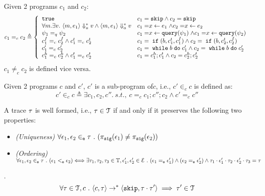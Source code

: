 \begin{defn}
%
\label{def:aq_prog}
Given 2 programs $c_1$ and $c_2$:
\[
c_1 =_{c} c_2
\triangleq 
\left\{
  \begin{array}{ll} 
    \etrue        
    & c_1 = \eskip \land c_2 = \eskip
    \\ 
    \forall m. \exists v. ~ \config{m, \expr_1} \aarrow^{*} v \land \config{m, \expr_1} \aarrow^{*} v     
    & c_1 = \assign{x}{\expr_1} \land c_2 = \assign{x}{\expr_2} 
    \\ 
    \qexpr_1 =_{q} \qexpr_2       
    & c_1 = \assign{x}{\query(\qexpr_1)} \land c_1 = \assign{x}{\query(\qexpr_2)} 
    \\
    c_1^f =_{c} c_2^f \land c_1^t =_{c} c_2^t
    & c_1 = \eif(b, c_1^t, c_1^f) \land c_2 = \eif(b, c_2^t, c_2^f)
    \\ 
    c_1' =_{c} c_2'         
    & c_1 = \ewhile b \edo c_1' \land c_2 = \ewhile b \edo c_2'
    \\ 
    c_1^h =_{c} c_2^h \land c_1^t =_{c} c_2^t
    & c_1 = c_1^h;c_1^t \land c_2 = c_2^h;c_2^t 
  \end{array}
  \right.
\]
%
$c_1 \neq_{c} c_2$  is defined vice versa.
%
\end{defn}
%
Given 2 programs $c$ and $c'$, $c'$ is a sub-program of$c$, i.e., $c' \in_{c} c$ is defined as:
\begin{equation}
c' \in_{c} c \triangleq \exists c_1, c_2, c''. ~ s.t.,~
c =_{c} c_1; c''; c_2 \land c' =_{c} c''
\end{equation} 
%
\begin{defn}
\label{def:wf_trace}
A trace $\mathtt{\tau}$ is well formed, i.e., $\mathtt{\tau} \in \mathcal{T}$ if and only if it preserves the following two properties:
\begin{itemize}
\item{\emph{(Uniqueness)}} 
$\forall \mathtt{\epsilon}_1, \mathtt{\epsilon}_2 \in_{\mathtt{e}} \mathtt{\tau} 
~.~ (\pi_{\mathtt{sig}}(\mathtt{\epsilon}_1) \neq \pi_{\mathtt{sig}}(\mathtt{\epsilon}_2) )$
%
\item{\emph{(Ordering)}} $\forall \mathtt{\epsilon}_1, \mathtt{\epsilon}_2 \in_{\mathtt{e}} \mathtt{\tau} ~.~ 
(\mathtt{\epsilon}_1 <_{\mathtt{e}} \mathtt{\epsilon}_2) \Longleftrightarrow
\exists \mathtt{\tau}_1, \mathtt{\tau}_2, \mathtt{\tau}_3 \in \mathbb{T},
 \mathtt{\epsilon}_1', \mathtt{\epsilon}_2' \in \mathcal{E} ~.~
(\mathtt{\epsilon}_1 =_{\mathtt{e}} \mathtt{\epsilon}_1') \land (\mathtt{\epsilon}_2 =_{\mathtt{e}} \mathtt{\epsilon}_2')
\land \mathtt{\tau}_1 \cdot \mathtt{\epsilon}_1' \cdot \mathtt{\tau}_2 \cdot \mathtt{\epsilon}_2' \cdot \mathtt{\tau}_3 = \mathtt{\tau}$
\end{itemize}
\end{defn}
%
%
\begin{thm}.
\label{thm:os_wf_trace}
\\
\[
\forall \mathtt{\tau} \in \mathcal{T}, c ~.~
\langle c, \mathtt{\tau} \rangle \to^{*} \langle \mathtt{skip}, \mathtt{\tau} \cdot \mathtt{\tau}' \rangle
\implies
\mathtt{\tau}' \in \mathcal{T}
\]
%
\end{thm}
